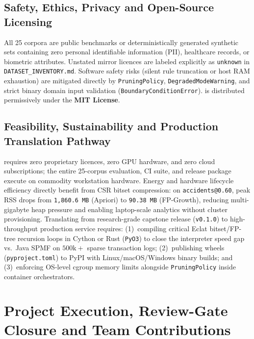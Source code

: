 \section{Safety, Ethics, Privacy and Open-Source Licensing}
All 25 corpora are public benchmarks or deterministically generated synthetic sets containing zero personal identifiable information (PII), healthcare records, or biometric attributes. Unstated mirror licences are labeled explicitly as \texttt{unknown} in \texttt{DATASET\_\protect\allowbreak{}INVENTORY.md}. Software safety risks (silent rule truncation or host RAM exhaustion) are mitigated directly by \texttt{PruningPolicy}, \texttt{DegradedModeWarning}, and strict binary domain input validation (\texttt{Boundary\protect\allowbreak{}Condition\protect\allowbreak{}Error}). \skarm is distributed permissively under the \textbf{MIT License}.

\section{Feasibility, Sustainability and Production Translation Pathway}
\skarm requires zero proprietary licences, zero GPU hardware, and zero cloud subscriptions; the entire 25-corpus evaluation, CI suite, and release package execute on commodity workstation hardware. Energy and hardware lifecycle efficiency directly benefit from CSR bitset compression: on \texttt{accidents@0.60}, peak RSS drops from \texttt{1,860.6 MB} (Apriori) to \texttt{90.38 MB} (FP-Growth), reducing multi-gigabyte heap pressure and enabling laptop-scale analytics without cluster provisioning. Translating \skarm from research-grade capstone release (\texttt{v0.1.0}) to high-throughput production service requires: (1)~compiling critical Eclat bitset/FP-tree recursion loops in Cython or Rust (\texttt{PyO3}) to close the interpreter speed gap vs.\ Java SPMF on $500\text{k}+$ sparse transaction logs; (2)~publishing wheels (\texttt{pyproject.toml}) to PyPI with Linux/macOS/Windows binary builds; and (3)~enforcing OS-level cgroup memory limits alongside \texttt{PruningPolicy} inside container orchestrators.\par
\endgroup

\chapter{Project Execution, Review-Gate Closure and Team Contributions}


